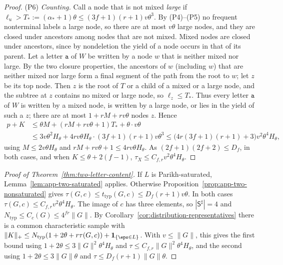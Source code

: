 \begin{proof}
(P6) \emph{Counting.}  Call a node that is not mixed \emph{large} if
$\ell_u>T_*:=(\alpha_*+1)\theta\le(3f+1)(r+1)v\theta^3$.  By (P4)--(P5) no frequent
nonterminal labels a large node, so there are at most $v\theta$ large nodes, and
they are closed under ancestors among nodes that are not mixed.  Mixed nodes are closed under ancestors, since by
nondeletion the yield of a node occurs in that of its parent.  Let a letter
$\mathtt a$ of $W$ be written by a node $w$ that is neither mixed nor large.  By the
two closure properties, the ancestors of $w$ (including $w$) that are neither
mixed nor large form a final segment of the path from the root to $w$; let $z$ be
its top node.  Then $z$ is the root of $T$ or a child of a mixed or a large node,
and the subtree at $z$ contains no mixed or large node, so $\ell_z\le T_*$.  Thus
every letter $\mathtt a$ of $W$ is written by a mixed node, is written by a large
node, or lies in the yield of such a $z$; there are at most $1+rM+rv\theta$ nodes
$z$.  Hence
\[
\begin{aligned}
 p+K&\le\theta M+(rM+rv\theta+1)T_*+\theta\cdot v\theta\\
 &\le3v\theta^2H_\theta+4rv\theta H_\theta\cdot(3f+1)(r+1)v\theta^3
 \le\bigl(4r(3f+1)(r+1)+3\bigr)v^2\theta^4H_\theta,
\end{aligned}
\]
using $M\le2v\theta H_\theta$ and $rM+rv\theta+1\le4rv\theta H_\theta$.  As
$(2f+1)(2f+2)\le D_f$, in both cases, and when
$K\le\theta+2(f-1)$, $\tau_X\le C_{f,r}v^2\theta^4H_\theta$.
\end{proof}

\begin{proof}[Proof of Theorem~\ref{thm:two-letter-content}]
If $L$ is Parikh-saturated, Lemma~\ref{lem:app-two-saturated} applies.  Otherwise
Proposition~\ref{prop:app-two-nonsaturated} gives
$\tau(G,c)\le t_{\mathrm{typ}}(G,c)\le D_f(r+1)v\theta$.  In both cases
$\tau(G,c)\le C_{f,r}v^2\theta^4H_\theta$.  The image of $c$ has three elements, so
$|\mathsf S^\sharp|=4$ and $N_{\mathrm{typ}}\le C_c(G)\le4^{fr}\|G\|$.  By
Corollary~\ref{cor:distribution-representatives} there is a common characteristic
sample with
$\|K\|_+\le N_{\mathrm{typ}}(1+2\theta+r\tau(G,c))+\mathbf 1_{\{\eps\in L\}}$.  With
$v\le\|G\|$, this gives the first bound using $1+2\theta\le3\|G\|^2\theta^4H_\theta$ and
$\tau\le C_{f,r}\|G\|^2\theta^4H_\theta$, and the second using $1+2\theta\le3\|G\|\theta$ and
$\tau\le D_f(r+1)\|G\|\theta$.
\end{proof}
